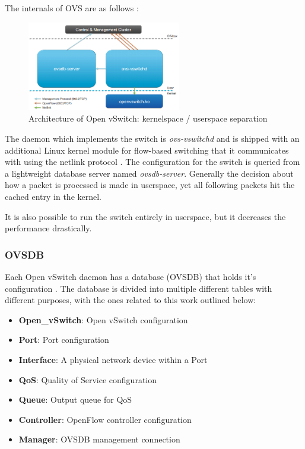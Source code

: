 The internals of OVS are as follows \cite{prognetworkingovs}:

\begin{figure}[H]
\centering
\includegraphics[width=0.6\textwidth]{images/fundamentals/openvswitch_architecture.png}
\caption{Architecture of Open vSwitch: kernelspace / userspace separation}
\end{figure}

The daemon which implements the switch is \textit{ovs-vswitchd} and is shipped with an additional Linux kernel module for flow-based switching that it communicates with using the netlink protocol \cite{ovsdeepdive}. The configuration for the switch is queried from a lightweight database server named \textit{ovsdb-server}.
Generally the decision about how a packet is processed is made in userspace, yet all following packets hit the cached entry in the kernel.

It is also possible to run the switch entirely in userspace, but it decreases the performance drastically.


\subsubsection{OVSDB}

Each Open vSwitch daemon has a database (OVSDB) that holds it's configuration \cite{ovsdbmanual}. The database is divided into multiple different tables with different purposes, with the ones related to this work outlined below:
\begin{itemize}
\item \textbf{Open\_vSwitch}: Open vSwitch configuration
\item \textbf{Port}: Port configuration
\item \textbf{Interface}: A physical network device within a Port
\item \textbf{QoS}: Quality of Service configuration
\item \textbf{Queue}: Output queue for QoS
\item \textbf{Controller}: OpenFlow controller configuration
\item \textbf{Manager}: OVSDB management connection
\end{itemize}


